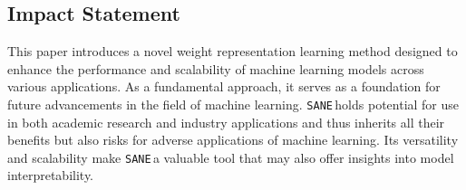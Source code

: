 \documentclass{article}
\theoremstyle{plain}
\theoremstyle{definition}
\theoremstyle{remark}
\newcommand{\ourmethod}{\texttt{SANE}\,}
\begin{document}
\subsection*{Impact Statement}
This paper introduces a novel weight representation learning method designed to enhance the performance and scalability of machine learning models across various applications. As a fundamental approach, it serves as a foundation for future advancements in the field of machine learning. \ourmethod holds potential for use in both academic research and industry applications and thus inherits all their benefits but also risks for adverse applications of machine learning. Its versatility and scalability make \ourmethod a valuable tool that may also offer insights into model interpretability.





\newpage
\appendix
\onecolumn


\end{document}
